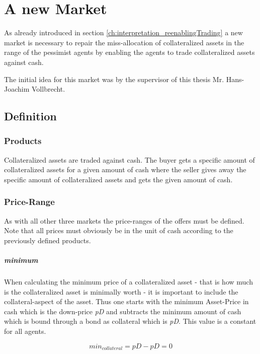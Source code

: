\documentclass[Bachelorarbeit.tex]{subfiles}
\begin{document}
\graphicspath{{./figures/newMarket/}}	%

\chapter{A new Market}
\label{ch:newMarket}
As already introduced in section \ref{ch:interpretation_reenablingTrading} a new market is necessary to repair the miss-allocation of collateralized assets in the range of the pessimist agents by enabling the agents to trade collateralized assets against cash.

\medskip

The initial idea for this market was by the supervisor of this thesis Mr. Hans-Joachim Vollbrecht.

\section{Definition}
\subsection{Products}
Collateralized assets are traded against cash. The buyer gets a specific amount of collateralized assets for a given amount of cash where the seller gives away the specific amount of collateralized assets and gets the given amount of cash.

\subsection{Price-Range}
As with all other three markets the price-ranges of the offers must be defined. Note that all prices must obviously be in the unit of cash according to the previously defined products.

\paragraph{minimum}
When calculating the minimum price of a collateralized asset - that is how much is the collateralized asset is minimally worth - it is important to include the collateral-aspect of the asset. Thus one starts with the minimum Asset-Price in cash which is the down-price \textit{pD} and subtracts the minimum amount of cash which is bound through a bond as collateral which is \textit{pD}. This value is a constant for all agents.

\begin{equation}
min_{collateral} = \textit{pD} - \textit{pD} = 0
\end{equation}
 
\end{document}
